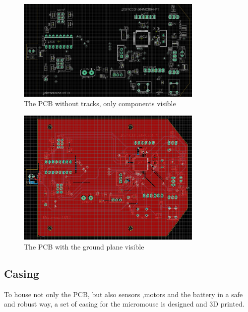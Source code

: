 \begin{figure}[htb]
    \centering
    \includegraphics[width=0.8\textwidth]{figures/hardware/PCB_Components.PNG}
    \caption{The PCB without tracks, only components visible}
    \label{fig:comp}
\end{figure}

\begin{figure}[htb]
    \centering
    \includegraphics[width=0.8\textwidth]{figures/hardware/PCB_Grounded.PNG}
    \caption{The PCB with the ground plane visible}
    \label{fig:gnd}
\end{figure}

\FloatBarrier

\subsection{Casing}

To house not only the PCB, but also sensors ,motors and the battery in a safe and robust way, a set of casing for the micromouse is designed and 3D printed.

